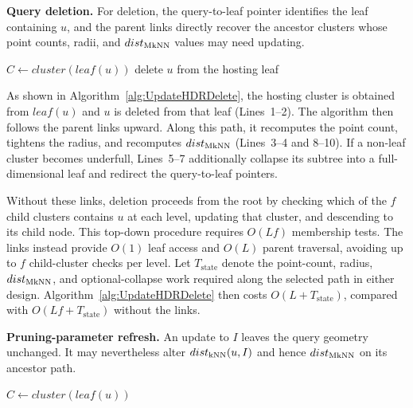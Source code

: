 \noindent\textbf{Query deletion.}
For deletion, the query-to-leaf pointer identifies the leaf containing $u$, and the parent links directly recover the ancestor clusters whose point counts, radii, and $dist_{\operatorname{MkNN}}$ values may need updating.

\begin{algorithm}[t]
\caption{Update\_HDR\_Delete($u$)}
\label{alg:UpdateHDRDelete}
$C \leftarrow cluster(leaf(u))$\;
delete $u$ from the hosting leaf\;
\end{algorithm}

As shown in Algorithm~\ref{alg:UpdateHDRDelete}, the hosting cluster is obtained from $leaf(u)$ and $u$ is deleted from that leaf (Lines~1--2). The algorithm then follows the parent links upward. Along this path, it recomputes the point count, tightens the radius, and recomputes $dist_{\operatorname{MkNN}}$ (Lines~3--4 and 8--10). If a non-leaf cluster becomes underfull, Lines~5--7 additionally collapse its subtree into a full-dimensional leaf and redirect the query-to-leaf pointers.

Without these links, deletion proceeds from the root by checking which of the $f$ child clusters contains $u$ at each level, updating that cluster, and descending to its child node. This top-down procedure requires $O(Lf)$ membership tests. The links instead provide $O(1)$ leaf access and $O(L)$ parent traversal, avoiding up to $f$ child-cluster checks per level. Let $T_{\mathrm{state}}$ denote the point-count, radius, $dist_{\operatorname{MkNN}}$, and optional-collapse work required along the selected path in either design. Algorithm~\ref{alg:UpdateHDRDelete} then costs $O(L+T_{\mathrm{state}})$, compared with $O(Lf+T_{\mathrm{state}})$ without the links.

\noindent\textbf{Pruning-parameter refresh.}
An update to $I$ leaves the query geometry unchanged. It may nevertheless alter $dist_{\operatorname{kNN}}(u,I)$ and hence $dist_{\operatorname{MkNN}}$ on its ancestor path.

\begin{algorithm}[t]
\caption{Update\_HDR\_Refresh($u$)}
\label{alg:UpdateHDRRefresh}
$C \leftarrow cluster(leaf(u))$\;
\end{algorithm}

